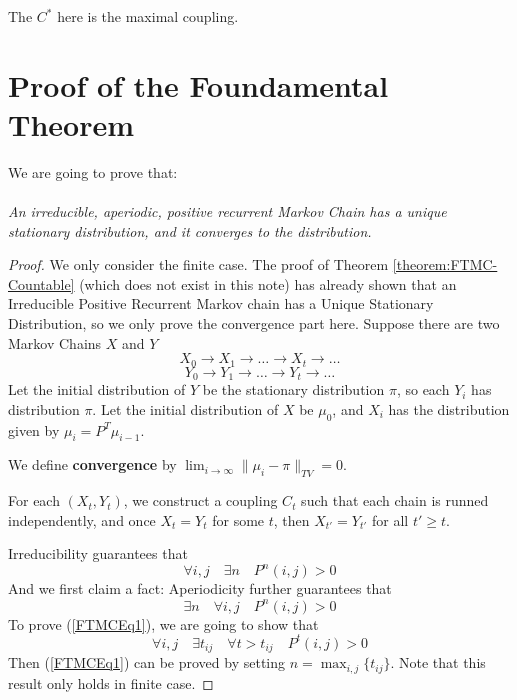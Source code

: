         \begin{remark}
            The $C^*$ here is the maximal coupling.
        \end{remark}


\section{Proof of the Foundamental Theorem}
    We are going to prove that:
    \paragraph{}
        \emph{An irreducible, aperiodic, positive recurrent Markov Chain has a unique stationary distribution, and it converges to the distribution.}

    \begin{proof}
        We only consider the finite case. The proof of Theorem \ref{theorem:FTMC-Countable} (which does not exist in this note) has already shown that an Irreducible Positive Recurrent Markov chain has a Unique Stationary Distribution, so we only prove the convergence part here. Suppose there are two Markov Chains $X$ and $Y$
        \[ X_0 \to X_1 \to \dots \to X_t \to \dots \]
        \[ Y_0 \to Y_1 \to \dots \to Y_t \to \dots \]
        Let the initial distribution of $Y$ be the stationary distribution $\pi$, so each $Y_i$ has distribution $\pi$. Let the initial distribution of $X$ be $\mu_0$, and $X_i$ has the distribution given by $\mu_{i} = P^T\mu_{i-1}$.

        We define \textbf{convergence} by $\lim_{i\to\infty}\|\mu_{i} - \pi\|_{TV} = 0$.

        For each $(X_t, Y_t)$, we construct a coupling $C_t$ such that each chain is runned independently, and once $X_t = Y_t$ for some $t$, then $X_{t'} = Y_{t'}$ for all $t' \ge t$.

        Irreducibility guarantees that 
        \[ \forall i,j \quad \exists n \quad P^n(i,j) > 0 \]
        And we first claim a fact: Aperiodicity further guarantees that
        \begin{equation}\label{FTMCEq1}
            \exists n \quad \forall i,j \quad P^n(i,j) > 0
        \end{equation}
        To prove (\ref{FTMCEq1}), we are going to show that
        \begin{equation}\label{FTMCEq2}
            \forall i,j \quad \exists t_{ij} \quad \forall t>t_{ij} \quad P^t(i,j) > 0
        \end{equation}
        Then (\ref{FTMCEq1}) can be proved by setting $n = \max_{i,j}\{t_{ij}\}$. Note that this result only holds in finite case.


\end{proof}
